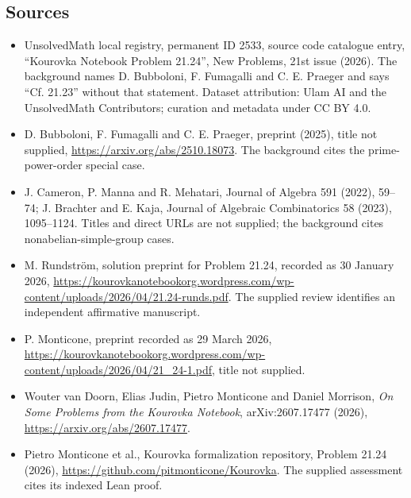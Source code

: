 \documentclass[11pt]{article}
\begin{document}
\subsection{Sources}
\begin{itemize}
\item UnsolvedMath local registry, permanent ID 2533, source code catalogue entry, ``Kourovka Notebook Problem 21.24'', New Problems, 21st issue (2026). The background names D. Bubboloni, F. Fumagalli and C. E. Praeger and says ``Cf. 21.23'' without that statement. Dataset attribution: Ulam AI and the UnsolvedMath Contributors; curation and metadata under CC BY 4.0.
\item D. Bubboloni, F. Fumagalli and C. E. Praeger, preprint (2025), title not supplied, \url{https://arxiv.org/abs/2510.18073}. The background cites the prime-power-order special case.
\item J. Cameron, P. Manna and R. Mehatari, Journal of Algebra 591 (2022), 59--74; J. Brachter and E. Kaja, Journal of Algebraic Combinatorics 58 (2023), 1095--1124. Titles and direct URLs are not supplied; the background cites nonabelian-simple-group cases.
\item M. Rundström, solution preprint for Problem 21.24, recorded as 30 January 2026, \url{https://kourovkanotebookorg.wordpress.com/wp-content/uploads/2026/04/21.24-runds.pdf}. The supplied review identifies an independent affirmative manuscript.
\item P. Monticone, preprint recorded as 29 March 2026, \url{https://kourovkanotebookorg.wordpress.com/wp-content/uploads/2026/04/21_24-1.pdf}, title not supplied.
\item Wouter van Doorn, Elias Judin, Pietro Monticone and Daniel Morrison, \emph{On Some Problems from the Kourovka Notebook}, arXiv:2607.17477 (2026), \url{https://arxiv.org/abs/2607.17477}.
\item Pietro Monticone et al., Kourovka formalization repository, Problem 21.24 (2026), \url{https://github.com/pitmonticone/Kourovka}. The supplied assessment cites its indexed Lean proof.
\end{itemize}
\end{document}

